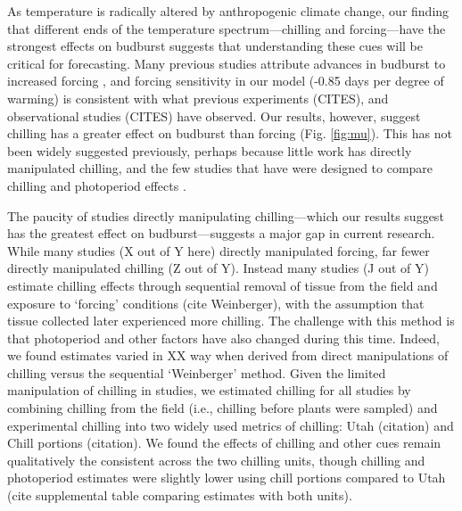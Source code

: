 \documentclass{article}
\begin{document}
\par As temperature is radically altered by anthropogenic climate change, our finding that different ends of the temperature spectrum---chilling and forcing---have the strongest effects on budburst suggests that understanding these cues will be critical for forecasting. Many previous studies attribute advances in budburst to increased forcing \citep{Basler:2014aa,bradley1999,menzel2006,harrington2015}, and forcing sensitivity in our model (-0.85 days per degree of warming) is consistent with what previous experiments (CITES), and observational studies (CITES) have observed. Our results, however, suggest chilling has a greater effect on budburst than forcing (Fig. \ref{fig:mu}). This has not been widely suggested previously, perhaps because little work has directly manipulated chilling, and the few studies that have were designed to compare chilling and photoperiod effects \citep[e.g., ][]{Basler:2014aa,Caffarra:2011qf,Laube:2014a,zohner2016}. 

\par The paucity of studies directly manipulating chilling---which our results suggest has the greatest effect on budburst---suggests a major gap in current research. While many studies (X out of Y here) directly manipulated forcing, far fewer directly manipulated chilling (Z out of Y). Instead many studies (J out of Y) estimate chilling effects through sequential removal of tissue from the field and exposure to `forcing' conditions (cite Weinberger), with the assumption that tissue collected later experienced more chilling. The challenge with this method is that photoperiod and other factors have also changed during this time. Indeed, we found estimates varied in XX way when derived from direct manipulations of chilling versus the sequential `Weinberger' method. Given the limited manipulation of chilling in studies, we estimated chilling for all studies by combining chilling from the field (i.e., chilling before plants were sampled) and experimental chilling into two widely used metrics of chilling: Utah (citation) and Chill portions (citation). We found the effects of chilling and other cues remain qualitatively the consistent across the two chilling units, though chilling and photoperiod estimates were slightly lower using chill portions compared to Utah (cite supplemental table comparing estimates with both units).  %
\end{document}
